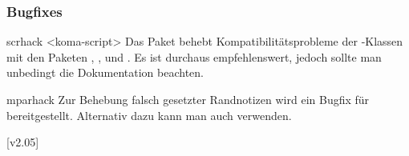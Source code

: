 \subsubsection{Bugfixes}
\begin{packages}
\item[scrhack]<koma-script>
  Das Paket behebt Kompatibilitätsprobleme der \KOMAScript-Klassen mit den 
  Paketen , ,  und
  . Es ist durchaus empfehlenswert, jedoch sollte man 
  unbedingt die Dokumentation beachten.
\item[mparhack]
  Zur Behebung falsch gesetzter Randnotizen wird ein Bugfix für 
   bereitgestellt. Alternativ dazu kann man auch 
   verwenden.
\end{packages}

[v2.05]
